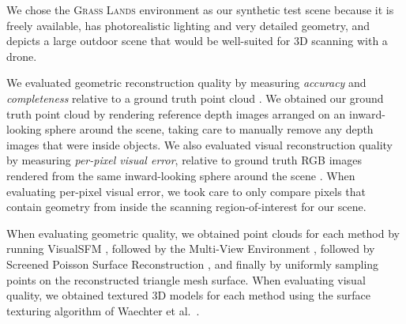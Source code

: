 We chose the \textsc{Grass Lands} environment \cite{epic:2017b} as our synthetic test scene because it is freely available, has photorealistic lighting and very detailed geometry, and depicts a large outdoor scene that would be well-suited for 3D scanning with a drone.

We evaluated geometric reconstruction quality by measuring \emph{accuracy} and \emph{completeness} relative to a ground truth point cloud \cite{aanaes:2016,knapitsch:2017}.
We obtained our ground truth point cloud by rendering reference depth images arranged on an inward-looking sphere around the scene, taking care to manually remove any depth images that were inside objects.
We also evaluated visual reconstruction quality by measuring \emph{per-pixel visual error}, relative to ground truth RGB images rendered from the same inward-looking sphere around the scene \cite{waechter:2017}.
When evaluating per-pixel visual error, we took care to only compare pixels that contain geometry from inside the scanning region-of-interest for our scene.

When evaluating geometric quality, we obtained point clouds for each method by running VisualSFM \cite{wu:2013,wu:2007,wu:2011b,wu:2011a}, followed by the Multi-View Environment \cite{fuhrmann:2015}, followed by Screened Poisson Surface Reconstruction \cite{kazhdan:2013}, and finally by uniformly sampling points on the reconstructed triangle mesh surface.
When evaluating visual quality, we obtained textured 3D models for each method using the surface texturing algorithm of Waechter et al.~\cite{waechter:2014}.


